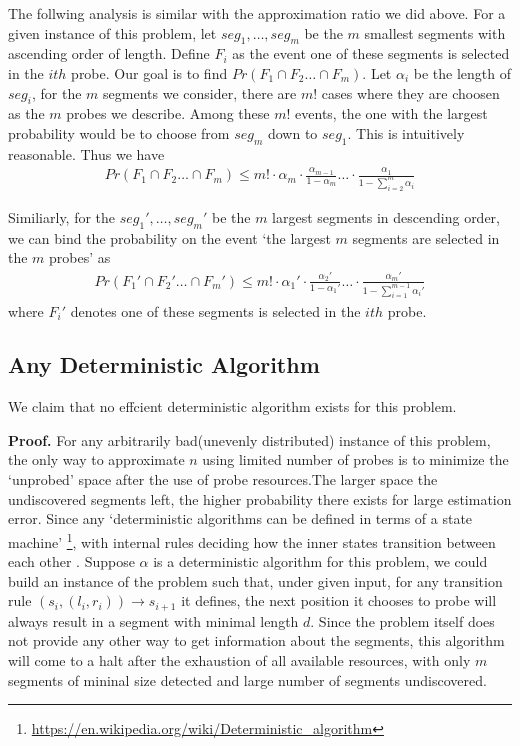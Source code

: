 \documentclass[titlepage]{article}
\begin{document}
The follwing analysis is similar with the approximation ratio we did above. For a given instance of this problem, let $seg_1, \dots , seg_m$ be the $m$ smallest segments with ascending order of length. Define $F_i$ as the event one of these segments is selected in the $ith$ probe. Our goal is to find $Pr(F_1 \cap F_2 \dots \cap F_m)$. Let $\alpha_i$ be the length of $seg_i$, for the $m$ segments we consider, there are $m!$ cases where they are choosen as the $m$ probes we describe. Among these $m!$ events, the one with the largest probability would be to choose from $seg_m$ down to $seg_1$. This is intuitively reasonable. Thus we have
\begin{align*}
Pr(F_1 \cap F_2 \dots \cap F_m) \leq m! \cdot \alpha_m \cdot \frac{\alpha_{m - 1}}{1 - \alpha_m} \dots \cdot \frac{\alpha_1}{1 - \sum_{i = 2}^{m}\alpha_i}
\end{align*}

Similiarly, for the $seg_1', \dots, seg_m'$ be the $m$ largest segments in descending order, we can bind the probability on the event `the largest $m$ segments are selected in the $m$ probes' as
\begin{align*}
Pr(F_1' \cap F_2' \dots \cap F_m') \leq m! \cdot \alpha_1' \cdot \frac{\alpha_{2}'}{1 - \alpha_1'} \dots \cdot \frac{\alpha_m'}{1 - \sum_{i = 1}^{m - 1}\alpha_i'}
\end{align*}
where $F_i'$ denotes one of these segments is selected in the $ith$ probe.

\subsection{Any Deterministic Algorithm}
We claim that no effcient deterministic algorithm exists for this problem.

\textbf{Proof. }For any arbitrarily bad(unevenly distributed) instance of this problem, the only way to approximate $n$ using limited number of probes is to minimize the `unprobed' space after the use of probe resources.The larger space the undiscovered segments left, the higher probability there exists for large estimation error. Since any `deterministic algorithms can be defined in terms of a state machine' \footnote{\url{https://en.wikipedia.org/wiki/Deterministic_algorithm}}, with internal rules deciding how the inner states transition between each other . Suppose $\alpha$ is a deterministic algorithm for this problem, we could build an instance of the problem such that, under given input, for any transition rule $(s_i, (l_i, r_i)) \to s_{i + 1}$ it defines, the next position it chooses to probe will always result in a segment with minimal length $d$. Since the problem itself does not provide any other way to get information about the segments, this algorithm will come to a halt after the exhaustion of all available resources, with only $m$ segments of mininal size detected and large number of segments undiscovered.
\end{document}
